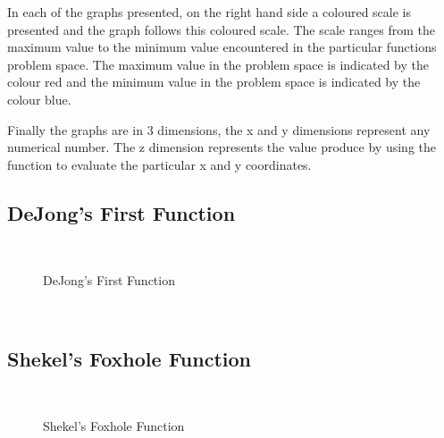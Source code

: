 In each of the graphs presented, on the right hand side a coloured scale is presented and the graph follows this coloured scale. The scale ranges from the maximum value to the minimum value encountered in the particular functions problem space. The maximum value in the problem space is indicated by the colour red and the minimum value in the problem space is indicated by the colour blue.

Finally the graphs are in 3 dimensions, the x and y dimensions represent any numerical number. The z dimension represents the value produce by using the function to evaluate the particular x and y coordinates.
\pagebreak
\subsection{DeJong's First Function}
~
\begin{figure}[hpt]
	\centering
	\setlength \fboxsep{0pt}
	\setlength \fboxrule{0.5pt}
	\caption{DeJong's First Function}
	\label{fig:DeJongF1Graph}
\end{figure}
~
\subsection{Shekel's Foxhole Function}
~
\begin{figure}[hpt]
	\centering
	\setlength \fboxsep{0pt}
	\setlength \fboxrule{0.5pt}
	\caption{Shekel's Foxhole Function}
	\label{fig:ShekelGraph}
\end{figure}
~
